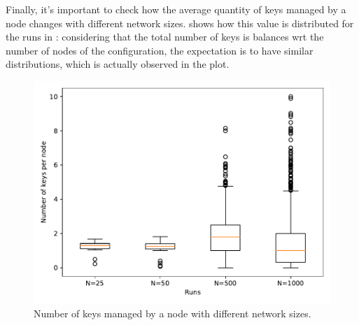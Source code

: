 \documentclass[11pt,twocolumn,letterpaper]{article}
\begin{document}
	Finally, it's important to check how the average quantity of keys managed by a node changes with different network sizes.  shows how this value is distributed for the runs in : considering that the total number of keys is balances wrt the number of nodes of the configuration, the expectation is to have similar distributions, which is actually observed in the plot. 
	\begin{figure}[!t]
		\centering
		\includegraphics[width=\linewidth,clip,trim=0 0.5cm 0 0.35cm]{figures/analysis3/keyspernode.pdf}
		\caption{Number of keys managed by a node with different network sizes.}
		\label{fig:keys4}
	\end{figure}	
\end{document}
